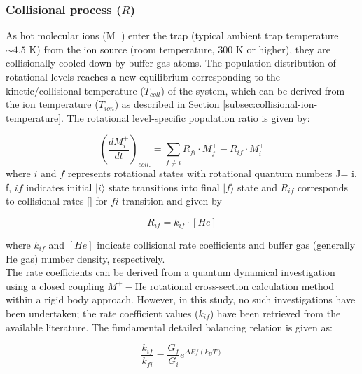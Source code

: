 \subsubsection{Collisional process (\texorpdfstring{$R$}\ )}
\label{subsec:ROSAA-simulation-coll}

As hot molecular ions (M$^+$) enter the trap (typical ambient trap temperature $\sim 4.5$ K) from the ion source (room temperature, 300 K or higher), they are collisionally cooled down by buffer gas atoms. The population distribution of rotational levels reaches a new equilibrium corresponding to the kinetic/collisional temperature ($T_{coll}$) of the system, which can be derived from the ion temperature ($T_{ion}$) as described in Section \ref{subsec:collisional-ion-temperature}. The rotational level-specific population ratio is given by:

\begin{equation}
    \left( \frac{dM^+_i}{dt} \right) _{coll.} = \sum_{f \neq i} R_{fi} \cdot M^+_f - R_{if} \cdot M^+_i
    \label{eqn:sim:coll}
\end{equation}
where $i$ and $f$ represents rotational states with rotational quantum numbers J= i, f, $if$ indicates initial $|i\rangle$ state transitions into final $|f\rangle$ state and $R_{if}$ corresponds to collisional rates [\pers] for $fi$ transition and given by 

\[ R_{if}=k_{if} \cdot [He] \]

where $k_{if}$ and $[He]$ indicate collisional rate coefficients and buffer gas (generally He gas) number density, respectively.\\

The rate coefficients can be derived from a quantum dynamical investigation using a closed coupling $M^+-$He rotational cross-section calculation method within a rigid body approach. However, in this study, no such investigations have been undertaken; the rate coefficient values ($k_{if}$) have been retrieved from the available literature. The fundamental detailed balancing relation is given as:

\begin{equation}
    \frac{k_{if}}{k_{fi}} = \frac{G_f}{G_i} e^{\Delta E / \left(k_B T \right)}
\end{equation}

